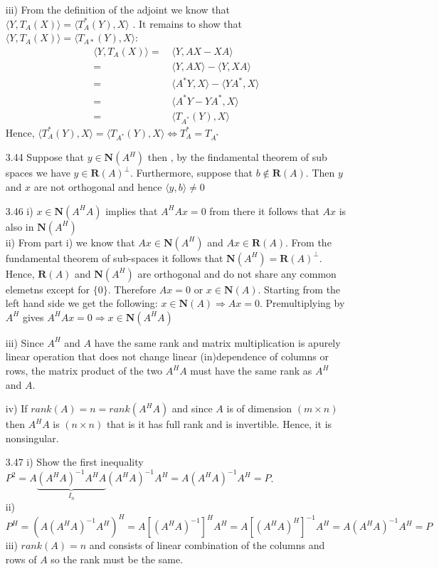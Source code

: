 \documentclass[letterpaper,12pt]{article}
\theoremstyle{definition}
\begin{document}
\begin{enumerate}
iii)
From the definition of the adjoint we know that $\langle Y, T_A(X) \rangle = \langle T_A^*(Y), X \rangle$ . It remains to show that $ \langle Y, T_A(X) \rangle = \langle T_{A*}(Y), X\rangle$:
\begin{align*}
\langle Y, T_A(X) \rangle  =&\, \langle Y, AX-XA\rangle\\
=& \, \langle Y, AX \rangle - \langle Y, XA \rangle\\
=&\, \langle A^*Y, X \rangle - \langle YA^*, X\rangle\\
=&\, \langle A^*Y-YA^*, X\rangle\\
=&\, \langle T_{A^*}(Y), X \rangle
\end{align*}
Hence, $\langle T_A^*(Y), X \rangle = \langle T_{A^*}(Y), X \rangle \iff T_A^* = T_{A^*}$ 
\item[3.44]
Suppose that  $y \in \mathbf{N}(A^H)$ then , by the findamental theorem of sub spaces we have $y \in \mathbf{R}(A)^{\perp}$. Furthermore, suppose that $b \not\in   \mathbf{R}(A)$. Then $y$  and $x$  are not orthogonal and hence $\langle y, b\rangle  \neq 0$
\item[3.46]
i) $x \in \mathbf{N}(A^HA)$ implies that $A^HAx=0$ from there it follows that $Ax$ is also in $\mathbf{N}(A^H)$\\

ii) From part i) we know that $Ax \in \mathbf{N}(A^H)$ and  $Ax \in \mathbf{R}(A)$. From the fundamental theorem of sub-spaces it follows that  $ \mathbf{N}(A^H) =  \mathbf{R}(A)^{\bot}$. Hence, $\mathbf{R}(A)$ and $ \mathbf{N}(A^H) $ are orthogonal and do not share any common elemetns except for $\{0\}$. Therefore $Ax=0$ or $x \in \mathbf{N}(A)$. Starting from the left hand side we get the following: $ x \in \mathbf{N}(A) \Rightarrow  Ax=0$. Premultiplying by $A^H$ gives $A^HAx=0 \Rightarrow x \in \mathbf{N}(A^HA)$  

iii) Since $A^H$ and $A$ have the same rank and matrix multiplication is apurely linear operation that does not change linear (in)dependence of columns or rows, the matrix product of the two $A^HA$ must have the same rank as $A^H$ and $A$.

iv) If  $rank(A) = n = rank(A^HA)$ and since $A$ is of dimension $( m\times n)$ then $A^HA$ is $( n\times n)$ that is it has full rank and is invertible. Hence, it is nonsingular.
\item[3.47]
i) Show the first inequality $P^2 = A \underbrace{(A^HA)^{-1}A^HA }_{I_n}
(A^HA)^{-1}A^H = A(A^HA)^{-1}A^H =P$.\\
ii)$P^H = (A(A^HA)^{-1}A^H)^H = A \left[(A^HA)^{-1}\right]^HA^H = A \left[(A^HA)^{H}\right]^{-1}A^H = A(A^HA)^{-1}A^H = P$ \\
iii) $rank(A)=n$ and consists of linear combination of the columns and rows of $A$ so the rank must be the same.


\end{enumerate}
\end{document}
